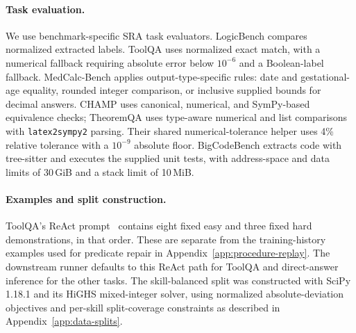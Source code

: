 \paragraph{Task evaluation.}
We use benchmark-specific SRA task evaluators. LogicBench compares normalized extracted labels. ToolQA uses normalized exact match, with a numerical fallback requiring absolute error below $10^{-6}$ and a Boolean-label fallback. MedCalc-Bench applies output-type-specific rules: date and gestational-age equality, rounded integer comparison, or inclusive supplied bounds for decimal answers. CHAMP uses canonical, numerical, and SymPy-based equivalence checks; TheoremQA uses type-aware numerical and list comparisons with \texttt{latex2sympy2} parsing. Their shared numerical-tolerance helper uses 4\% relative tolerance with a $10^{-9}$ absolute floor. BigCodeBench extracts code with tree-sitter and executes the supplied unit tests, with address-space and data limits of 30\,GiB and a stack limit of 10\,MiB.

\paragraph{Examples and split construction.}
ToolQA's ReAct prompt~\citep{yao2023react} contains eight fixed easy and three fixed hard demonstrations, in that order. These are separate from the training-history examples used for predicate repair in Appendix~\ref{app:procedure-replay}. The downstream runner defaults to this ReAct path for ToolQA and direct-answer inference for the other tasks. The skill-balanced split was constructed with SciPy 1.18.1 and its HiGHS mixed-integer solver, using normalized absolute-deviation objectives and per-skill split-coverage constraints as described in Appendix~\ref{app:data-splits}.
